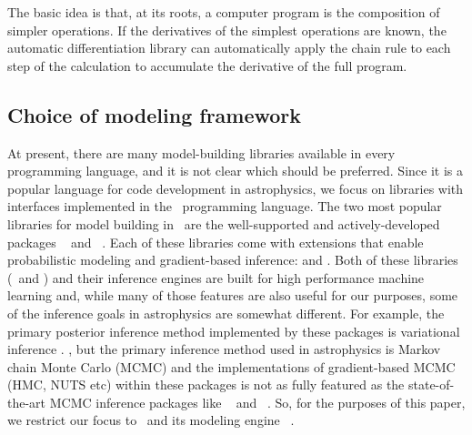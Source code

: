 \documentclass[modern]{aastex62}
\begin{document}
The basic idea is that, at its roots, a computer program is the composition of simpler operations.
If the derivatives of the simplest operations are known, the automatic differentiation library can automatically apply the chain rule to each step of the calculation to accumulate the derivative of the full program.

\subsection{Choice of modeling framework}

At present, there are many model-building libraries available in every programming language, and it is not clear which should be preferred.
Since it is a popular language for code development in astrophysics, we focus on libraries with interfaces implemented in the \python\ programming language.
The two most popular libraries for model building in \python\ are the well-supported and actively-developed packages \tensorflow\ \citep{Abadi:2016} and \pytorch\ \citep{Paszke:2017}.
Each of these libraries come with extensions that enable probabilistic modeling and gradient-based inference:  \citep{Dillon:2017} and  \citep{Bingham:2018}.
Both of these libraries (\tensorflow\ and \pytorch) and their inference engines are built for high performance machine learning and, while many of those features are also useful for our purposes, some of the inference goals in astrophysics are somewhat different.
For example, the primary posterior inference method implemented by these packages is variational inference .
, but the primary inference method used in astrophysics is Markov chain Monte Carlo (MCMC) and the implementations of gradient-based MCMC (HMC, NUTS etc) within these packages is not as fully featured as the state-of-the-art MCMC inference packages like \pymc\ \citep{Salvatier:2016} and \stan\ \citep{Carpenter:2015, Carpenter:2017}.
So, for the purposes of this paper, we restrict our focus to \pymc\ and its modeling engine \theano\ \citep{Theano-Development-Team:2016}.
\end{document}
